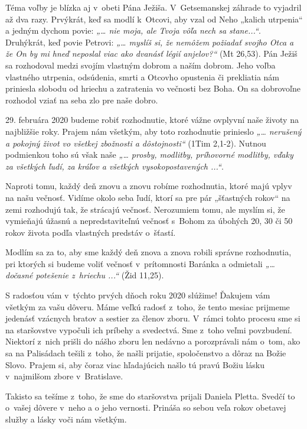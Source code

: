 Téma voľby je blízka aj v~obeti Pána Ježiša. V~Getsemanskej záhrade to vyjadril až dva razy. Prvýkrát, keď sa modlí k~Otcovi, aby vzal od Neho „kalich utrpenia“ a jedným dychom povie: {\it „… nie moja, ale Tvoja vôľa nech sa stane...“}. Druhýkrát, keď povie Petrovi: {\it „… myslíš si, že nemôžem požiadať svojho Otca a že On by mi hneď neposlal viac ako dvanásť légií anjelov?“} (Mt 26,53). Pán Ježiš sa rozhodoval medzi svojím vlastným dobrom a naším dobrom. Jeho voľba vlastného utrpenia, odsúdenia, smrti a Otcovho opustenia či prekliatia nám priniesla slobodu od hriechu a zatratenia vo večnosti bez Boha. On sa dobrovoľne rozhodol vziať na seba zlo pre naše dobro.

29. februára 2020 budeme robiť rozhodnutie, ktoré vážne ovplyvní naše životy na najbližšie roky. Prajem nám všetkým, aby toto rozhodnutie prinieslo {\it„… nerušený  a pokojný život vo všetkej zbožnosti a dôstojnosti“} (1Tim 2,1-2). Nutnou podmienkou toho sú však naše {\it „… prosby, modlitby, príhovorné modlitby, vďaky za všetkých ľudí, za kráľov a všetkých vysokopostavených ...“}.

Naproti tomu, každý deň znovu a znovu robíme rozhodnutia, ktoré majú vplyv na našu večnosť. Vidíme okolo seba ľudí, ktorí sa pre pár „šťastných rokov“ na zemi rozhodujú tak, že strácajú večnosť. Nerozumiem tomu, ale myslím si, že vymieňajú úžasnú a nepredstaviteľnú večnosť s~Bohom za úbohých 20, 30 či 50 rokov života podľa vlastných predstáv o~šťastí.

Modlím sa za to, aby sme každý deň znova a znova robili správne rozhodnutia, pri ktorých si budeme voliť večnosť v~prítomnosti Baránka a odmietali {\it „… dočasné potešenie z~hriechu ...“} (Žid 11,25).



S radosťou vám v~týchto prvých dňoch roku 2020 slúžime! Ďakujem vám všetkým za vašu dôveru. Máme veľkú radosť z~toho, že tento mesiac prijmeme jedenásť vzácnych bratov a sestier za členov zboru. V~rámci tohto procesu sme si na staršovstve vypočuli ich príbehy a svedectvá. Sme z~toho veľmi povzbudení. Niektorí z~nich prišli do nášho zboru len nedávno a porozprávali nám o~tom, ako sa na Palisádach tešili z~toho, že našli prijatie, spoločenstvo a dôraz na Božie Slovo. Prajem si, aby čoraz viac hľadajúcich našlo tú pravú Božiu lásku v~najmilšom zbore v~Bratislave.

Takisto sa tešíme z~toho, že sme do staršovstva prijali Daniela Pletta. Svedčí to o~vašej dôvere v~neho a o jeho vernosti. Prináša so sebou veľa rokov obetavej služby a lásky voči nám všetkým.

